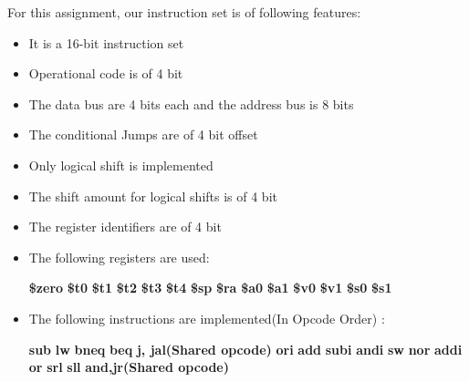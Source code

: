 \documentclass[12pt]{article}
\begin{document}
For this assignment, our instruction set is of following features:
\begin{itemize}
    \item It is a 16-bit instruction set
    \item Operational code is of 4 bit
    \item The data bus are 4 bits each and the address bus is 8 bits
    \item The conditional Jumps are of 4 bit offset
    \item Only logical shift is implemented
    \item The shift amount for logical shifts is of 4 bit 
    \item The register identifiers are of 4 bit
    \item The following registers are used: 
\begin{multicols}{4}
    \subitem \textbf{\$zero}
    \subitem \textbf{\$t0}
    \subitem \textbf{\$t1}
    \subitem \textbf{\$t2}
    \subitem \textbf{\$t3}
    \subitem \textbf{\$t4}
    \subitem \textbf{\$sp}
    \subitem \textbf{\$ra}
    \subitem \textbf{\$a0}
    \subitem \textbf{\$a1}
    \subitem \textbf{\$v0}
    \subitem \textbf{\$v1}
    \subitem \textbf{\$s0}
    \subitem \textbf{\$s1}

\end{multicols}

\item The following instructions are implemented(In Opcode Order) :
\begin{multicols}{2}

    \subitem \textbf{sub}
    \subitem \textbf{lw}
    \subitem \textbf{bneq}
    \subitem \textbf{beq}
    \subitem \textbf{j, jal(Shared opcode)}
    \subitem \textbf{ori}
    \subitem \textbf{add}
    \subitem \textbf{subi}
    \subitem \textbf{andi}
    \subitem \textbf{sw}
    \subitem \textbf{nor}
    \subitem \textbf{addi}
    \subitem \textbf{or}
    \subitem \textbf{srl}
    \subitem \textbf{sll}
    \subitem \textbf{and,jr(Shared opcode)}
    
\end{multicols}
    
\end{itemize}
\end{document}
